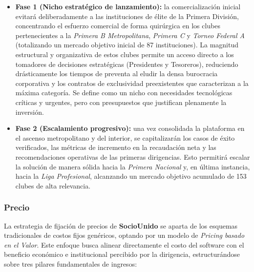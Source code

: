 \begin{itemize}
    \item \textbf{Fase 1 (Nicho estratégico de lanzamiento):} la comercialización inicial evitará deliberadamente a las instituciones de élite de la Primera División, concentrando el esfuerzo comercial de forma quirúrgica en los clubes pertenecientes a la \textit{Primera B Metropolitana}, \textit{Primera C} y \textit{Torneo Federal A} (totalizando un mercado objetivo inicial de 87 instituciones). La magnitud estructural y organizativa de estos clubes permite un acceso directo a los tomadores de decisiones estratégicas (Presidentes y Tesoreros), reduciendo drásticamente los tiempos de preventa al eludir la densa burocracia corporativa y los contratos de exclusividad preexistentes que caracterizan a la máxima categoría. Se define como un nicho con necesidades tecnológicas críticas y urgentes, pero con presupuestos que justifican plenamente la inversión.
    \item \textbf{Fase 2 (Escalamiento progresivo):} una vez consolidada la plataforma en el ascenso metropolitano y del interior, se capitalizarán los casos de éxito verificados, las métricas de incremento en la recaudación neta y las recomendaciones operativas de las primeras dirigencias. Esto permitirá escalar la solución de manera sólida hacia la \textit{Primera Nacional} y, en última instancia, hacia la \textit{Liga Profesional}, alcanzando un mercado objetivo acumulado de 153 clubes de alta relevancia.
\end{itemize}

\subsubsection*{Precio}

La estrategia de fijación de precios de \textbf{SocioUnido} se aparta de los esquemas tradicionales de costos fijos genéricos, optando por un modelo de \textit{Pricing basado en el Valor}. Este enfoque busca alinear directamente el costo del software con el beneficio económico e institucional percibido por la dirigencia, estructurándose sobre tres pilares fundamentales de ingresos:

